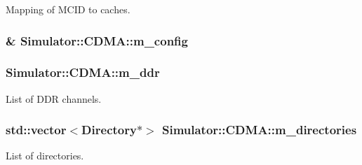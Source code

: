 Mapping of M\+C\+I\+D to caches. 

\hypertarget{class_simulator_1_1_c_d_m_a_ae8160f56f781f1fc878578a011ef45df}{
\subsubsection[{m\+\_\+config}]{\& Simulator\+::\+C\+D\+M\+A\+::m\+\_\+config\hspace{0.3cm}{\ttfamily [protected]}}}\label{class_simulator_1_1_c_d_m_a_ae8160f56f781f1fc878578a011ef45df}
\hypertarget{class_simulator_1_1_c_d_m_a_a49092d8f924f613e08729377d051d865}{
\subsubsection[{m\+\_\+ddr}]{ Simulator\+::\+C\+D\+M\+A\+::m\+\_\+ddr\hspace{0.3cm}{\ttfamily [protected]}}}\label{class_simulator_1_1_c_d_m_a_a49092d8f924f613e08729377d051d865}


List of D\+D\+R channels. 

\hypertarget{class_simulator_1_1_c_d_m_a_a2b6130ba000d98aff4ee59d07bf489a5}{
\subsubsection[{m\+\_\+directories}]{\setlength{\rightskip}{0pt plus 5cm}std\+::vector$<${\bf Directory}$\ast$$>$ Simulator\+::\+C\+D\+M\+A\+::m\+\_\+directories\hspace{0.3cm}{\ttfamily [protected]}}}\label{class_simulator_1_1_c_d_m_a_a2b6130ba000d98aff4ee59d07bf489a5}


List of directories. 

